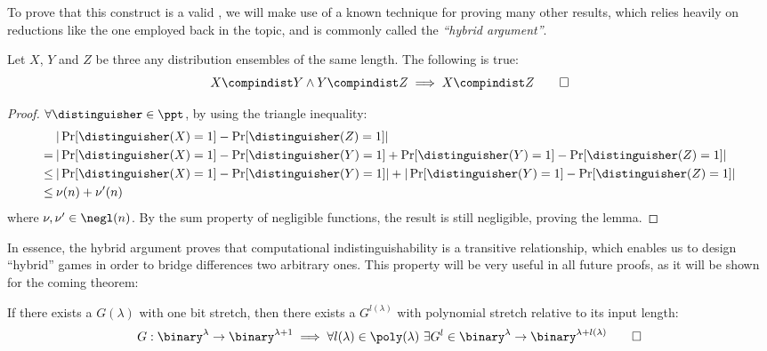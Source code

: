 To prove that this construct is a valid \prg, we will make use of a known technique for proving many other results, which relies heavily on reductions like the one employed back in the \owf{} topic, and is commonly called the \emph{``hybrid argument''}.
    
\begin{lemma} \label{lem:hybrid}
    Let $X$, $Y$ and $Z$ be three any distribution ensembles of the same length. The following is true:
    \[
        X \compindist Y \wedge Y \compindist Z \implies X \compindist Z \qedhere
    \] 
\end{lemma}
\begin{proof}
    $\forall \distinguisher \in \ppt$, by using the triangle inequality:
    \begin{align*}
        & |\Pr[\distinguisher(X) = 1] - \Pr[\distinguisher(Z) = 1]| \\
        =\:& |\Pr[\distinguisher(X) = 1] - \Pr[\distinguisher(Y) = 1] + \Pr[\distinguisher(Y) = 1] - \Pr[\distinguisher(Z) = 1]| \\
        \leq\:& |\Pr[\distinguisher(X) = 1] - \Pr[\distinguisher(Y) = 1]| + |\Pr[\distinguisher(Y) = 1] - \Pr[\distinguisher(Z) = 1]| \\
        \leq\:& \nu(n) + \nu'(n)
    \end{align*}
    where $\nu, \nu' \in \negl(n)$. By the sum property of negligible functions, the result is still negligible, proving the lemma.
\end{proof}

In essence, the hybrid argument proves that computational indistinguishability is a transitive relationship, which enables us to design ``hybrid'' games in order to bridge differences two arbitrary ones. This property will be very useful in all future proofs, as it will be shown for the coming theorem:

\begin{theorem}
    If there exists a \prg{} $G(\lambda)$ with one bit stretch, then there exists a \prg{} $G^{l(\lambda)}$ with polynomial stretch relative to its input length:
    \begin{equation*}
        G : \binary^\lambda \to \binary^{\lambda + 1} \implies \forall l(\lambda) \in \poly(\lambda)\ \exists G^l \in \binary^\lambda \to \binary^{\lambda + l(\lambda)} \qedhere
    \end{equation*} 
\end{theorem}

